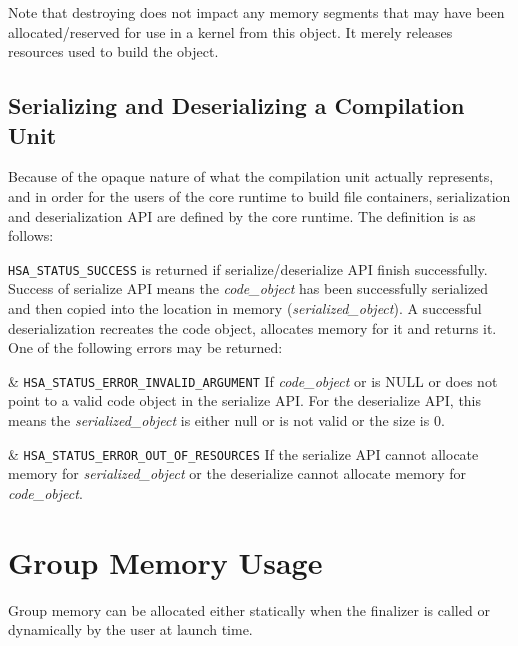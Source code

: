 Note that destroying does not impact any memory segments that may
have been allocated/reserved for use in a kernel from this object.
It merely releases resources used to build the object.

\subsection{Serializing and Deserializing a Compilation Unit}

Because of the opaque nature of what the compilation unit actually
represents, and in order for the users of the core runtime to build
file containers, serialization and deserialization API are defined
by the core runtime. The definition is as follows:



\texttt{HSA\_STATUS\_SUCCESS} is returned if serialize/deserialize
API finish successfully. Success of serialize API means the
{\itshape code\_object} has been successfully serialized and then
copied into the location in memory ({\itshape serialized\_object}).
A successful deserialization recreates the code object, allocates
memory for it and returns it. One of the following errors may be
returned:
\begin{easylist}
& \texttt{HSA\_STATUS\_ERROR\_INVALID\_ARGUMENT} If {\itshape
code\_object} or is NULL or does not point to a valid code object in
the serialize API. For the deserialize API, this means the {\itshape
serialized\_object} is either null or is not valid or the size is 0.

& \texttt{HSA\_STATUS\_ERROR\_OUT\_OF\_RESOURCES} If the serialize API
cannot allocate memory for {\itshape serialized\_object} or the
deserialize cannot allocate memory for {\itshape code\_object}.
\end{easylist}


\hypertarget{coreapi_group_mem}{}\section{Group Memory
Usage}\label{coreapi_group_mem}
Group memory can be allocated either statically when the finalizer
is called or dynamically by the user at launch time.


